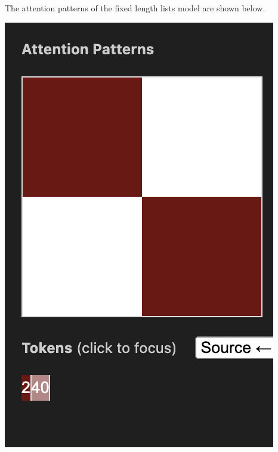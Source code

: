 \documentclass{article}
\begin{document}
The attention patterns of the fixed length lists model are shown below.

\begin{center}
    \includegraphics[scale=0.4]{att_fixed.png}

\end{center}
\end{document}
